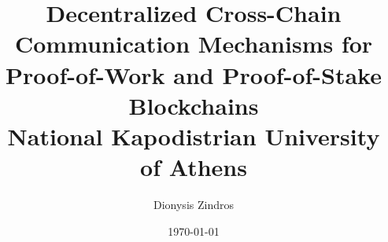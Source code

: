 \documentclass{report}
\begin{document}

\begin{titlepage}
  \title{
    {Decentralized Cross-Chain Communication Mechanisms for Proof-of-Work and Proof-of-Stake Blockchains} \\
  {\large National Kapodistrian University of Athens} \\
  }
  \author{Dionysis Zindros}
  \date{\today}
  \maketitle
\end{titlepage}

\newpage

\thispagestyle{empty}
\null

\newpage
\end{document}
